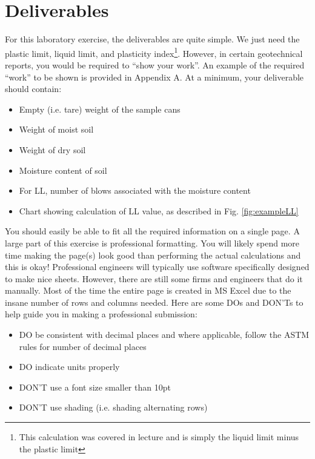 \documentclass[12pt]{article}
\begin{document}
\pagebreak
\section{Deliverables}
For this laboratory exercise, the deliverables are quite simple. We just need the plastic limit, liquid limit, and plasticity index\footnote{This calculation was covered in lecture and is simply the liquid limit minus the plastic limit}. However, in certain geotechnical reports, you would be required to ``show your work''. An example of the required ``work'' to be shown is provided in Appendix A. At a minimum, your deliverable should contain:
\begin{itemize}
    \item Empty (i.e. tare) weight of the sample cans
    \item Weight of moist soil
    \item Weight of dry soil
    \item Moisture content of soil
    \item For LL, number of blows associated with the moisture content
    \item Chart showing calculation of LL value, as described in Fig. \ref{fig:exampleLL}
\end{itemize}

You should easily be able to fit all the required information on a single page. A large part of this exercise is professional formatting. You will likely spend more time making the page(s) look good than performing the actual calculations and this is okay! Professional engineers will typically use software specifically designed to make nice sheets. However, there are still some firms and engineers that do it manually. Most of the time the entire page is created in MS Excel due to the insane number of rows and columns needed. Here are some DOs and DON'Ts to help guide you in making a professional submission:

\begin{itemize}
    \item DO be consistent with decimal places and where applicable, follow the ASTM rules for number of decimal places
    \item DO indicate units properly
    \item DON'T use a font size smaller than 10pt
    \item DON'T use shading (i.e. shading alternating rows)
\end{itemize}

%
%
\end{document}
